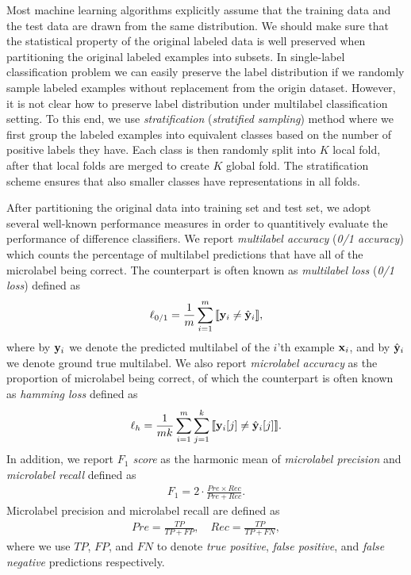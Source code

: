 {Most machine learning algorithms explicitly assume that the training data and the test data are drawn from the same distribution.
We should make sure that the statistical property of the original labeled data is well preserved when partitioning the original labeled examples into subsets.
In single-label classification problem we can easily preserve the label distribution if we randomly sample labeled examples without replacement from the origin dataset.
However, it is not clear how to preserve label distribution under multilabel classification setting.
To this end, we use \textit{stratification} (\textit{stratified sampling}) method where we first group the labeled examples into equivalent classes based on the number of positive labels they have. 
Each class is then randomly split into $K$ local fold, after that local folds are merged to create $K$ global fold.
The stratification scheme ensures that also smaller classes have representations in all folds. 

After partitioning the original data into training set and test set, we adopt several well-known performance measures in order to quantitively evaluate the performance of difference classifiers.
We report \textit{multilabel accuracy} (\textit{0/1 accuracy}) which counts the percentage of multilabel predictions that have all of the microlabel being correct.
The counterpart is often known as \textit{multilabel loss} (\textit{0/1 loss}) defined as
\begin{align*}
	\ell_{0/1} = \frac{1}{m}\sum_{i=1}^{m}{\llbracket \mathbf {y}_i \neq \hat{\mathbf {y}}_i \rrbracket},
\end{align*}
where by $\mathbf {y}_i$ we denote the predicted multilabel of the $i$'th example $\mathbf {x}_i$, and by $\hat{\mathbf {y}}_i$ we denote ground true multilabel.
We also report \textit{microlabel accuracy} as the proportion of microlabel being correct, of which the counterpart is often known as \textit{hamming loss} defined as
\begin{align*}
	\ell_{h} = \frac{1}{mk}\sum_{i=1}^{m}\sum_{j=1}^{k}{\llbracket \mathbf {y}_i[j] \neq \hat{\mathbf {y}}_i[j] \rrbracket}.
\end{align*}
In addition, we report \textit{$F_1$ score} as the harmonic mean of \textit{microlabel precision} and \textit{microlabel recall} defined as
\begin{align*}
	F_1 = 2\cdot\frac{Pre\times Rec}{Pre+Rec}.
\end{align*}
Microlabel precision and microlabel recall are defined as
\begin{align*}
	Pre = \frac{TP}{TP+FP}, \quad Rec = \frac{TP}{TP+FN},
\end{align*}
where we use $TP$, $FP$, and $FN$ to denote \textit{true positive}, \textit{false positive}, and \textit{false negative} predictions respectively.


}
